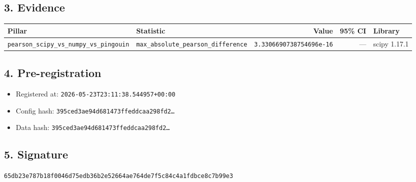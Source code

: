 \documentclass{article}
\begin{document}
\subsection*{3. Evidence}
\begin{tabular}{llrrl}\toprule
\textbf{Pillar} & \textbf{Statistic} & \textbf{Value} & \textbf{95\% CI} & \textbf{Library} \\\midrule
\texttt{pearson\_scipy\_vs\_numpy\_vs\_pingouin} & \texttt{max\_absolute\_pearson\_difference} & \texttt{3.3306690738754696e-16} & --- & scipy 1.17.1 \\
\bottomrule\end{tabular}
\subsection*{4. Pre-registration}
\begin{itemize}
\item Registered at: \texttt{2026-05-23T23:11:38.544957+00:00}
\item Config hash: \texttt{395ced3ae94d681473ffeddcaa298fd2\dots}
\item Data hash: \texttt{395ced3ae94d681473ffeddcaa298fd2\dots}
\end{itemize}
\subsection*{5. Signature}
\texttt{65db23e787b18f0046d75edb36b2e52664ae764de7f5c84c4a1fdbce8c7b99e3}\\
\end{document}
